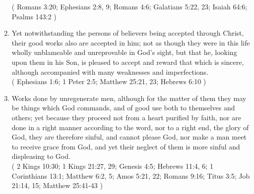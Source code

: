\documentclass[12pt,a4paper]{book}
\begin{document}
\begin{enumerate}
( Romans 3:20; Ephesians 2:8, 9; Romans 4:6; Galatians 5:22, 23; Isaiah 64:6; Psalms 143:2 )
\item
\label{ch-goo-wor-6}
Yet notwithstanding the persons of believers being accepted through Christ, their good works also are accepted in him; not as though they were in this life wholly unblameable and unreprovable in God's sight, but that he, looking upon them in his Son, is pleased to accept and reward that which is sincere, although accompanied with many weaknesses and imperfections.\\
( Ephesians 1:6; 1 Peter 2:5; Matthew 25:21, 23; Hebrews 6:10 )
\item
\label{ch-goo-wor-7}
Works done by unregenerate men, although for the matter of them they may be things which God commands, and of good use both to themselves and others; yet because they proceed not from a heart purified by faith, nor are done in a right manner according to the word, nor to a right end, the glory of God, they are therefore sinful, and cannot please God, nor make a man meet to receive grace from God, and yet their neglect of them is more sinful and displeasing to God.\\
( 2 Kings 10:30; 1 Kings 21:27, 29; Genesis 4:5; Hebrews 11:4, 6; 1 Corinthians 13:1; Matthew 6:2, 5; Amos 5:21, 22; Romans 9:16; Titus 3:5; Job 21:14, 15; Matthew 25:41-43 )
\end{enumerate}
\end{document}

